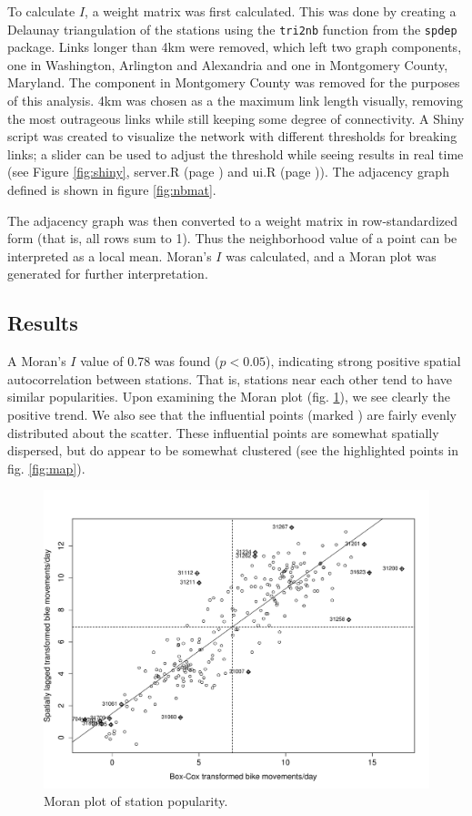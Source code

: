 \documentclass[letterpaper,11pt]{article}
\newcommand{\reflst}[1]{#1 (page \pageref{#1})}
\begin{document}
To calculate $I$, a weight matrix was first calculated. This was done
by creating a Delaunay triangulation of the stations using the
\texttt{tri2nb} function from the \texttt{spdep} package. Links longer
than 4km were removed, which left two graph components, one in
Washington, Arlington and Alexandria and one in Montgomery County,
Maryland. The component in Montgomery County was removed for the
purposes of this analysis. 4km was chosen as a the maximum link length
visually, removing the most outrageous links while still keeping some
degree of connectivity. A Shiny script was created to visualize the
network with different thresholds for breaking links; a slider can be
used to adjust the threshold while seeing results in real time (see
Figure \ref{fig:shiny}, \reflst{server.R} and \reflst{ui.R}). The
adjacency graph defined is shown in figure \ref{fig:nbmat}.

The adjacency graph was then converted to a weight matrix in
row-standardized form (that is, all rows sum to 1). Thus the
neighborhood value of a point can be interpreted as a local
mean. Moran's $I$ was calculated, and a Moran plot was generated for
further interpretation.

\subsection{Results}

A Moran's $I$ value of 0.78 was found ($p < 0.05$), indicating strong
positive spatial autocorrelation between stations. That is, stations
near each other tend to have similar popularities. Upon examining the
Moran plot (fig. \ref{fig:moran}), we see clearly the positive
trend. We also see that the influential points (marked
\rlap{\tiny{+}}{$\diamond$}) are fairly evenly distributed about the
scatter. These influential points are somewhat spatially dispersed,
but do appear to be somewhat clustered (see the highlighted points in
fig. \ref{fig:map}).

\begin{figure}[t]
  \includegraphics[width=\textwidth]{moran_plot.pdf}
  \caption{\label{fig:moran} Moran plot of station popularity.}
\end{figure}
\end{document}
